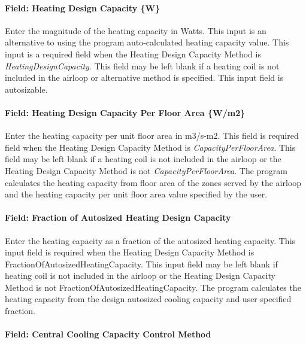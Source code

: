 \paragraph{Field: Heating Design Capacity \{W\}}\label{field-heating-design-capacity-w-1}

Enter the magnitude of the heating capacity in Watts. This input is an alternative to using the program auto-calculated heating capacity value. This input is a required field when the Heating Design Capacity Method is \emph{HeatingDesignCapacity}. This field may be left blank if a heating coil is not included in the airloop or alternative method is specified. This input field is autosizable.

\paragraph{Field: Heating Design Capacity Per Floor Area \{W/m2\}}\label{field-heating-design-capacity-per-floor-area-wm2-1}

Enter the heating capacity per unit floor area in m3/s-m2. This field is required field when the Heating Design Capacity Method is \emph{CapacityPerFloorArea}. This field may be left blank if a heating coil is not included in the airloop or the Heating Design Capacity Method is not \emph{CapacityPerFloorArea}. The program calculates the heating capacity from floor area of the zones served by the airloop and the heating capacity per unit floor area value specified by the user.

\paragraph{Field: Fraction of Autosized Heating Design Capacity}\label{field-fraction-of-autosized-heating-design-capacity-1}

Enter the heating capacity as a fraction of the autosized heating capacity. This input field is required when the Heating Design Capacity Method is FractionOfAutosizedHeatingCapacity. This input field may be left blank if heating coil is not included in the airloop or the Heating Design Capacity Method is not FractionOfAutosizedHeatingCapacity. The program calculates the heating capacity from the design autosized cooling capacity and user specified fraction.

\paragraph{Field: Central Cooling Capacity Control Method}\label{field-central-cooling-capacity-control-method}

